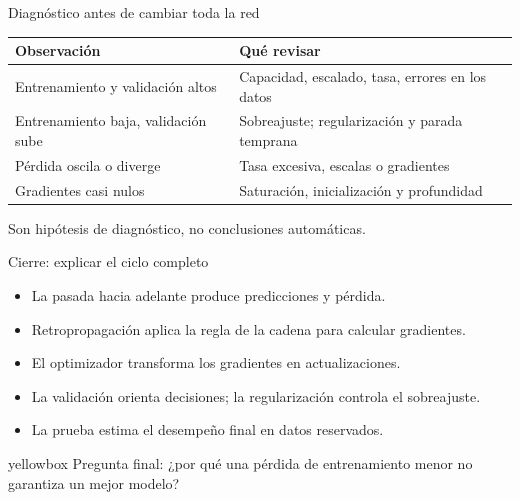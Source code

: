 \documentclass[10pt,aspectratio=169,xcolor={dvipsnames}]{beamer}
\newenvironment{caja}[1][lgraybox]{\begin{beamercolorbox}[sep=0.7em,wd=\linewidth]{#1}}{\end{beamercolorbox}}
\begin{document}
\begin{frame}{Diagnóstico antes de cambiar toda la red}
\small
\begin{tabular}{p{}p{}}\toprule
Observación & Qué revisar\\\midrule
Entrenamiento y validación altos & Capacidad, escalado, tasa, errores en los datos\\[2mm]
Entrenamiento baja, validación sube & Sobreajuste; regularización y parada temprana\\[2mm]
Pérdida oscila o diverge & Tasa excesiva, escalas o gradientes\\[2mm]
Gradientes casi nulos & Saturación, inicialización y profundidad\\\bottomrule
\end{tabular}\par\bigskip
Son hipótesis de diagnóstico, no conclusiones automáticas.
\note{}
\end{frame}

\begin{frame}{Cierre: explicar el ciclo completo}
\begin{itemize}
\item La pasada hacia adelante produce predicciones y pérdida.
\item Retropropagación aplica la regla de la cadena para calcular gradientes.
\item El optimizador transforma los gradientes en actualizaciones.
\item La validación orienta decisiones; la regularización controla el sobreajuste.
\item La prueba estima el desempeño final en datos reservados.
\end{itemize}\begin{caja}[yellowbox]
Pregunta final: ¿por qué una pérdida de entrenamiento menor no garantiza un mejor modelo?
\end{caja}

\note{}
\end{frame}
\end{document}
